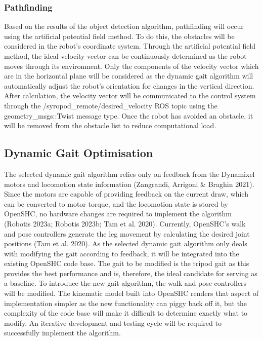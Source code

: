 \subsubsection{Pathfinding}
Based on the results of the object detection algorithm, pathfinding will occur using the artificial potential field method. To do this, the obstacles will be considered in the robot's coordinate system. Through the artificial potential field method, the ideal velocity vector can be continuously determined as the robot moves through its environment. Only the components of the velocity vector which are in the horizontal plane will be considered as the dynamic gait algorithm will automatically adjust the robot's orientation for changes in the vertical direction. After calculation, the velocity vector will be communicated to the control system through the \slash syropod\_remote\slash desired\_velocity ROS topic using the geometry\_msgs::Twist message type. Once the robot has avoided an obstacle, it will be removed from the obstacle list to reduce computational load.

\subsection{Dynamic Gait Optimisation}
The selected dynamic gait algorithm relies only on feedback from the Dynamixel motors and locomotion state information (Zangrandi, Arrigoni \& Braghin 2021). Since the motors are capable of providing feedback on the current draw, which can be converted to motor torque, and the locomotion state is stored by OpenSHC, no hardware changes are required to implement the algorithm (Robotis 2023a; Robotis 2023b; Tam et al. 2020). Currently, OpenSHC's walk and pose controllers generate the leg movement by calculating the desired joint positions (Tam et al. 2020). As the selected dynamic gait algorithm only deals with modifying the gait according to feedback, it will be integrated into the existing OpenSHC code base. The gait to be modified is the tripod gait as this provides the best performance and is, therefore, the ideal candidate for serving as a baseline. To introduce the new gait algorithm, the walk and pose controllers will be modified. The kinematic model built into OpenSHC renders that aspect of implementation simpler as the new functionality can piggy back off it, but the complexity of the code base will make it difficult to determine exactly what to modify. An iterative development and testing cycle will be required to successfully implement the algorithm. 


